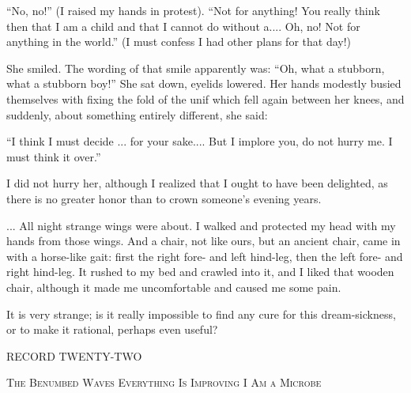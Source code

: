 \documentclass[11pt,openany]{book}
\begin{document}
``No, no!'' (I raised my hands in protest). ``Not for anything! You really think then that I am a child and that I cannot do without a.... Oh, no! Not for anything in the world.'' (I must confess I had other plans for that day!)

She smiled. The wording of that smile apparently was: ``Oh, what a stubborn, what a stubborn boy!'' She sat down, eyelids lowered. Her hands modestly busied themselves with fixing the fold of the unif which fell again between her knees, and suddenly, about something entirely different, she said:

``I think I must decide ... for your sake.... But I implore you, do not hurry me. I must think it over.''

I did not hurry her, although I realized that I ought to have been delighted, as there is no greater honor than to crown someone's evening years.

... All night strange wings were about. I walked and protected my head with my hands from those wings. And a chair, not like ours, but an ancient chair, came in with a horse-like gait: first the right fore- and left hind-leg, then the left fore- and right hind-leg. It rushed to my bed and crawled into it, and I liked that wooden chair, although it made me uncomfortable and caused me some pain.

It is very strange; is it really impossible to find any cure for this dream-sickness, or to make it rational, perhaps even useful?

\begin{center}\textsc{RECORD TWENTY-TWO}\end{center}

\begin{center}\textsc{The Benumbed Waves Everything Is Improving I Am a Microbe}\end{center}
\end{document}

